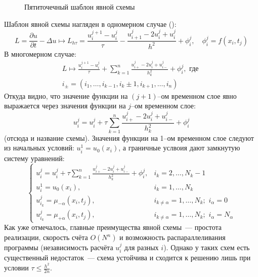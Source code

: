 \begin{figure}
    \centering
    \caption{Пятиточечный шаблон явной схемы}
    \label{fig:ExplicitTemplate}
\end{figure}
Шаблон явной схемы нагляден в одномерном случае ():
\begin{equation*}
    L = \frac{\partial u}{\partial t} - \Delta u \mapsto 
    L_{h\tau} = \frac{u_i^{j + 1} - u_i^j}{\tau} - 
    \frac{u_{i + 1}^j - 2u_i^j + u_i^j}{h^2} + \phi_i^j,\quad \phi_i^j = f(x_i, t_j)
\end{equation*}
В многомерном случае:
\begin{multline*}
    L \mapsto 
    \frac{u_i^{j + 1} - u_i^j}{\tau} + \sum\limits_{k = 1}^{n}
    \frac{u_{i+}^j - 2u_i^j + u_{i-}^j}{h_k^2} + \phi_i^j,\text{ где }\\
    i_{\pm} = (i_1, \ldots, i_{k - 1}, i_k \pm 1, i_{k + 1}, \ldots, i_n)
\end{multline*}
Откуда видно, что значение функции на $(j + 1)$--ом временном слое явно выражается через значения функции на $j$--ом временном слое:
\begin{equation*}
    u_i^{j} = u_i^j + \tau \sum\limits_{k = 1}^{n}
    \frac{u_{i+}^j - 2u_i^j + u_{i-}^j}{h_k^2} + \phi_i^j
\end{equation*}
(отсюда и название схемы). Значения функции на 1--ом временном слое следуют из начальных условий: $u_i^1 = u_0(x_i)$, а граничные услвоия дают замкнутую систему уравнений:
\begin{equation*}
    \begin{cases}
        u_i^{j} = u_i^j + \tau \sum\limits_{k = 1}^{n} \frac{u_{i+}^j - 2u_i^j + u_{i-}^j}{h_k^2} + \phi_i^j, & i_k = 2, \ldots, N_k - 1\\
        u_i^1 = u_0(x_i), & i_k = 1, \ldots, N_k\\
        u_{i_k}^{j} = \mu_{-\alpha}(x_i, t_j), & i_{k \ne \alpha} = 1, \ldots, N_k;\,\, i_{\alpha} = 0\\
        u_{i_k}^{j} = \mu_{+\alpha}(x_i, t_j), & i_{k \ne \alpha} = 1, \ldots, N_k;\,\, i_{\alpha} = N_{\alpha}
    \end{cases}
\end{equation*}
Как уже отмечалось, главные преимущества явной схемы~--- простота реализации, скорость счёта $O(N^n)$ и возможность распараллеливания программы (независимость расчёта $u_i^j$ для разных $i$).
Однако у таких схем есть существенный недостаток~--- схема устойчива и сходится к решению лишь при условии
$
\tau \le \frac{h^2}{2n}
$.
